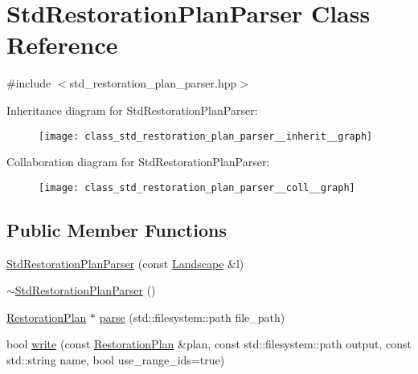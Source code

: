 \hypertarget{class_std_restoration_plan_parser}{}\section{Std\+Restoration\+Plan\+Parser Class Reference}
\label{class_std_restoration_plan_parser}


{\ttfamily \#include $<$std\+\_\+restoration\+\_\+plan\+\_\+parser.\+hpp$>$}



Inheritance diagram for Std\+Restoration\+Plan\+Parser\+:\nopagebreak
\begin{figure}[H]
\begin{center}
\leavevmode
\texttt{[image: class\_std\_restoration\_plan\_parser\_\_inherit\_\_graph]}
\end{center}
\end{figure}


Collaboration diagram for Std\+Restoration\+Plan\+Parser\+:\nopagebreak
\begin{figure}[H]
\begin{center}
\leavevmode
\texttt{[image: class\_std\_restoration\_plan\_parser\_\_coll\_\_graph]}
\end{center}
\end{figure}
\subsection*{Public Member Functions}
\begin{DoxyCompactItemize}
\item 
\hyperlink{class_std_restoration_plan_parser_ab8af49e4d1b8fa2490b454e71b42ee10}{Std\+Restoration\+Plan\+Parser} (const \hyperlink{class_landscape}{Landscape} \&l)
\item 
\hyperlink{class_std_restoration_plan_parser_a489cfc5395301d3d32c00a3409ddd10d}{$\sim$\+Std\+Restoration\+Plan\+Parser} ()
\item 
\hyperlink{class_restoration_plan}{Restoration\+Plan} $\ast$ \hyperlink{class_std_restoration_plan_parser_aa9156823445695123f32e2eb232a3509}{parse} (std\+::filesystem\+::path file\+\_\+path)
\item 
bool \hyperlink{class_std_restoration_plan_parser_a988b830911043a737c889971a746f13d}{write} (const \hyperlink{class_restoration_plan}{Restoration\+Plan} \&plan, const std\+::filesystem\+::path output, const std\+::string name, bool use\+\_\+range\+\_\+ids=true)
\end{DoxyCompactItemize}
